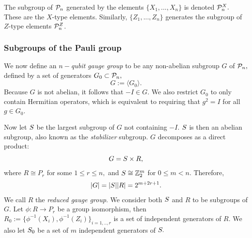 \documentclass[12pt]{article}
\begin{document}
The subgroup of $\mathcal{P}_n$ generated by
the elements $\{X_1,...,X_n\}$ %
is denoted $\mathcal{P}_n^X.$ These are the $X$-type
elements. Similarly,
 $\{Z_1,...,Z_n\}$ generates %
the subgroup of $Z$-type elements $\mathcal{P}_n^Z$.

\subsubsection{Subgroups of the Pauli group}

We now define an {\it $n-$qubit gauge group} to be 
any non-abelian subgroup $G$ of $\mathcal{P}_n,$
defined by a set of generators $G_0\subset \mathcal{P}_n,$
$$ G := \langle G_0\rangle.$$
Because $G$ is not abelian, it follows that $-I\in G.$
We also restrict $G_0$ to only contain Hermitian operators,
which is equivalent to requiring that $g^2=I$ for all $g\in G_0.$

Now let $S$ be the largest subgroup of $G$ not containing
$-I.$
$S$ is then an abelian subgroup,
also known as the {\it stabilizer} subgroup.
$G$ decomposes as a direct product:
$$G = S\times R,$$
where $R\cong P_r$ for some $1\le r\le n,$
and $S\cong \mathbb{Z}_2^{m}$ for $0\le m<n.$
Therefore, 
$$|G| = |S| |R| = 2^{m+2r+1}.$$
We call $R$ the {\it reduced gauge group}.
We consider both $S$ and $R$ to be subgroups of $G.$
Let $\phi:R\to P_r$ be a group isomorphism,
then $R_0 := \{\phi^{-1}(X_i), \phi^{-1}(Z_i)\}_{i=1,..,r}$
is a set of independent generators of $R.$
We also let $S_0$ be a set of $m$ independent generators of $S.$
\end{document}
